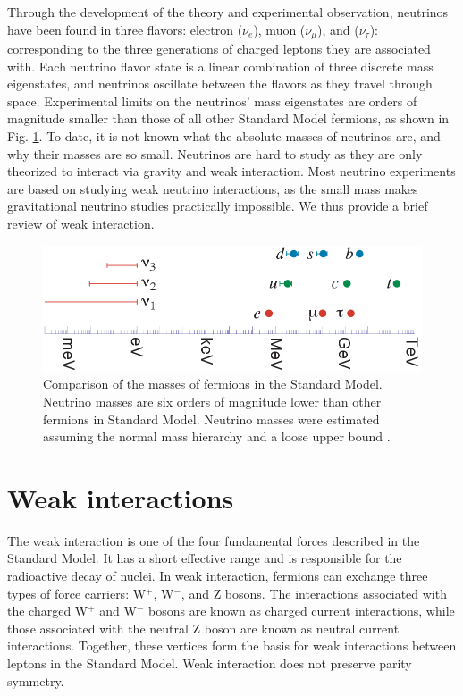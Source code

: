 Through the development of the theory and experimental observation, neutrinos have been found in three flavors: electron ($\nu_e$), muon ($\nu_{\mu}$), and ($\nu_{\tau}$): corresponding to the three generations of charged leptons they are associated with. Each neutrino flavor state is a linear combination of three discrete mass eigenstates, and neutrinos oscillate between the flavors as they travel through space. Experimental limits on the neutrinos' mass eigenstates are orders of magnitude smaller than those of all other Standard Model fermions, as shown in Fig. \ref{n_mass_comp}. To date, it is not known what the absolute masses of neutrinos are, and why their masses are so small. Neutrinos are hard to study as they are only theorized to interact via gravity and weak interaction. Most neutrino experiments are based on studying weak neutrino interactions, as the small mass makes gravitational neutrino studies practically impossible. We thus provide a brief review of weak interaction.

\vspace{0.3cm}
\begin{figure}[!htb]
\centering
\includegraphics[width=0.85\linewidth]{ch1/figs/n_mass_comp.png}
\vspace{0.3cm}
\caption{Comparison of the masses of fermions in the Standard Model. Neutrino masses are six orders of magnitude lower than other fermions in Standard Model. Neutrino masses were estimated assuming the normal mass hierarchy and a loose upper bound \cite{Hewett:2012ns}.}
\label{n_mass_comp}
\end{figure}

\section{Weak interactions}
The weak interaction is one of the four fundamental forces described in the Standard Model. It has a short effective range and is responsible for the radioactive decay of nuclei. In weak interaction, fermions can exchange three types of force carriers: W$^+$, W$^-$, and Z bosons. The interactions associated with the charged W$^+$ and W$^-$ bosons are known as charged current interactions, while those associated with the neutral Z boson are known as neutral current interactions. Together, these vertices form the basis for weak interactions between leptons in the Standard Model. Weak interaction does not preserve parity symmetry.\cite{wu_experiment}


